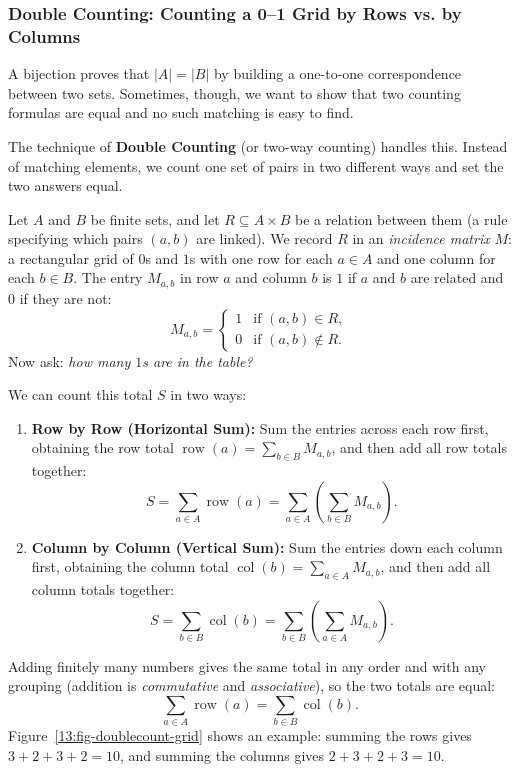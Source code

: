 \subsubsection{Double Counting: Counting a 0--1 Grid by Rows vs. by Columns}

A bijection proves that $|A| = |B|$ by building a one-to-one correspondence between two sets. Sometimes, though, we want to show that two counting formulas are equal and no such matching is easy to find.

The technique of \textbf{Double Counting} (or two-way counting) handles this. Instead of matching elements, we count one set of pairs in two different ways and set the two answers equal.

Let $A$ and $B$ be finite sets, and let $R \subseteq A \times B$ be a relation between them (a rule specifying which pairs $(a, b)$ are linked). We record $R$ in an \emph{incidence matrix} $M$: a rectangular grid of $0$s and $1$s with one row for each $a \in A$ and one column for each $b \in B$. The entry $M_{a,b}$ in row $a$ and column $b$ is $1$ if $a$ and $b$ are related and $0$ if they are not:
\[
M_{a, b} = \begin{cases} 1 & \text{if } (a, b) \in R, \\ 0 & \text{if } (a, b) \notin R. \end{cases}
\]
Now ask: \emph{how many $1$s are in the table?}

We can count this total $S$ in two ways:
\begin{enumerate}
\item \textbf{Row by Row (Horizontal Sum):} Sum the entries across each row first, obtaining the row total $\operatorname{row}(a) = \sum_{b \in B} M_{a, b}$, and then add all row totals together:
\[
S = \sum_{a \in A} \operatorname{row}(a) = \sum_{a \in A} \left( \sum_{b \in B} M_{a, b} \right).
\]
\item \textbf{Column by Column (Vertical Sum):} Sum the entries down each column first, obtaining the column total $\operatorname{col}(b) = \sum_{a \in A} M_{a, b}$, and then add all column totals together:
\[
S = \sum_{b \in B} \operatorname{col}(b) = \sum_{b \in B} \left( \sum_{a \in A} M_{a, b} \right).
\]
\end{enumerate}
Adding finitely many numbers gives the same total in any order and with any grouping (addition is \emph{commutative} and \emph{associative}), so the two totals are equal:
\[
\sum_{a \in A} \operatorname{row}(a) = \sum_{b \in B} \operatorname{col}(b).
\]
Figure~\ref{13:fig-doublecount-grid} shows an example: summing the rows gives $3 + 2 + 3 + 2 = 10$, and summing the columns gives $2 + 3 + 2 + 3 = 10$.

